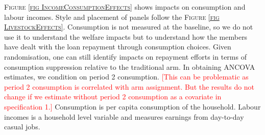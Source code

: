 \begin{figure}
\end{figure}

	\textsc{\small Figure \ref{fig IncomeConsumptionEffects}} shows impacts on consumption and labour incomes. Style and placement of panels follow the \textsc{\footnotesize Figure \ref{fig LivestockEffects}}. Consumption is not measured at the baseline, so we do not use it to understand the welfare impacts but to understand how the members have dealt with the loan repayment through consumption choices. Given randomisation, one can still identify impacts on repayment efforts in terms of consumption suppression relative to the \textsf{traditional} arm. In obtaining ANCOVA estimates, we condition on period 2 consumption. \textcolor{red}{[This can be problematic as period 2 consumption is correlated with arm assignment. But the results do not change if we estimate without period 2 consumption as a covariate in specification 1.]} Consumption is per capita consumption of the household. Labour incomes is a household level variable and measures earnings from day-to-day casual jobs. 

